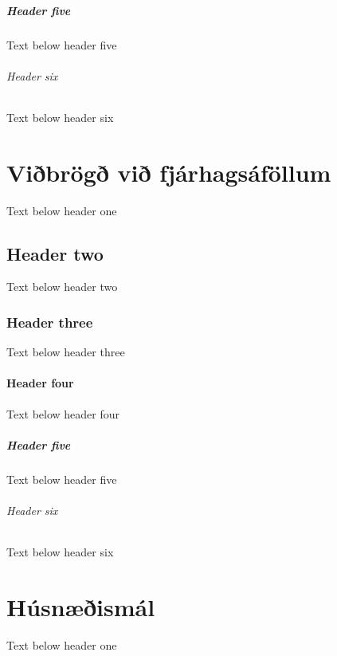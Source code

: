 \documentclass[a4paper,10pt,icelandic]{sphinxmanual}
\begin{document}
\paragraph{Header five}
\label{\detokenize{eftirlaun-og-langtimassparnadur/index:header-five}}
\sphinxAtStartPar
Text below header five


\subparagraph{Header six}
\label{\detokenize{eftirlaun-og-langtimassparnadur/index:header-six}}
\sphinxAtStartPar
Text below header six

\sphinxstepscope


\chapter{Viðbrögð við fjárhagsáföllum}
\label{\detokenize{vidbrogd-vid-fjarhagsafollum/index:vibrog-vi-fjarhagsafollum}}\label{\detokenize{vidbrogd-vid-fjarhagsafollum/index::doc}}
\sphinxAtStartPar
Text below header one


\section{Header two}
\label{\detokenize{vidbrogd-vid-fjarhagsafollum/index:header-two}}
\sphinxAtStartPar
Text below header two


\subsection{Header three}
\label{\detokenize{vidbrogd-vid-fjarhagsafollum/index:header-three}}
\sphinxAtStartPar
Text below header three


\subsubsection{Header four}
\label{\detokenize{vidbrogd-vid-fjarhagsafollum/index:header-four}}
\sphinxAtStartPar
Text below header four


\paragraph{Header five}
\label{\detokenize{vidbrogd-vid-fjarhagsafollum/index:header-five}}
\sphinxAtStartPar
Text below header five


\subparagraph{Header six}
\label{\detokenize{vidbrogd-vid-fjarhagsafollum/index:header-six}}
\sphinxAtStartPar
Text below header six

\sphinxstepscope


\chapter{Húsnæðismál}
\label{\detokenize{husnaedismal/index:husnaeismal}}\label{\detokenize{husnaedismal/index::doc}}
\sphinxAtStartPar
Text below header one
\end{document}
